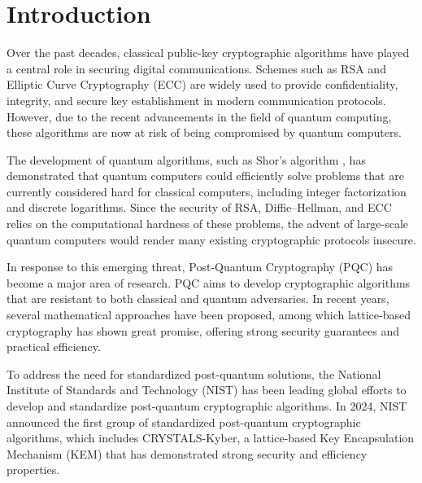 \documentclass[12pt]{article}
\begin{document}
\setcounter{page}{0}


\renewcommand*\contentsname{Index}
\tableofcontents
\newpage

\section{Introduction}

Over the past decades, classical public-key cryptographic algorithms have played a central role in securing digital communications. Schemes such as RSA and Elliptic Curve Cryptography (ECC) are widely used to provide confidentiality, integrity, and secure key establishment in modern communication protocols. However, due to the recent advancements in the field of quantum computing, these algorithms are now at risk of being compromised by quantum computers.

The development of quantum algorithms, such as Shor’s algorithm \cite{shor1994}, has demonstrated that quantum computers could efficiently solve problems that are currently considered hard for classical computers, including integer factorization and discrete logarithms. Since the security of RSA, Diffie–Hellman, and ECC relies on the computational hardness of these problems, the advent of large-scale quantum computers would render many existing cryptographic protocols insecure.

In response to this emerging threat, Post-Quantum Cryptography (PQC) has become a major area of research. PQC aims to develop cryptographic algorithms that are resistant to both classical and quantum adversaries. In recent years, several mathematical approaches have been proposed, among which lattice-based cryptography has shown great promise, offering strong security guarantees and practical efficiency.

To address the need for standardized post-quantum solutions, the National Institute of Standards and Technology (NIST)\cite{nist2024} has been leading global efforts to develop and standardize post-quantum cryptographic algorithms. In 2024, NIST announced the first group of standardized post-quantum cryptographic algorithms, which includes CRYSTALS-Kyber\cite{kyberspec}, a lattice-based Key Encapsulation Mechanism (KEM) that has demonstrated strong security and efficiency properties.
\end{document}
